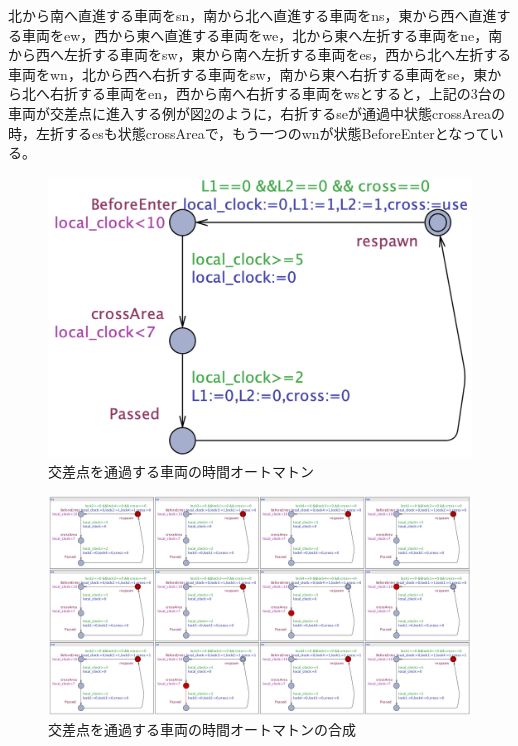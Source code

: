 \documentclass{tpu-sotu}
\begin{document}
	北から南へ直進する車両をsn，南から北へ直進する車両をns，東から西へ直進する車両をew，西から東へ直進する車両をwe，北から東へ左折する車両をne，南から西へ左折する車両をsw，東から南へ左折する車両をes，西から北へ左折する車両をwn，北から西へ右折する車両をsw，南から東へ右折する車両をse，東から北へ右折する車両をen，西から南へ右折する車両をwsとすると，上記の3台の車両が交差点に進入する例が図\ref{SimpleS}のように，右折するseが通過中状態crossAreaの時，左折するesも状態crossAreaで，もう一つのwnが状態BeforeEnterとなっている。
	\begin{figure}[htbp]
	\centering
	\includegraphics[width=140mm]{SimpleIntersection.png}
	\caption{交差点を通過する車両の時間オートマトン}
	\label{Simple}
	\end{figure}
	\begin{figure}[htbp]
	\centering
	\includegraphics[width=150mm]{SimpleIntersectionSimu.png}
	\caption{交差点を通過する車両の時間オートマトンの合成}
	\label{SimpleS}
	\end{figure}
	
	
\end{document}
